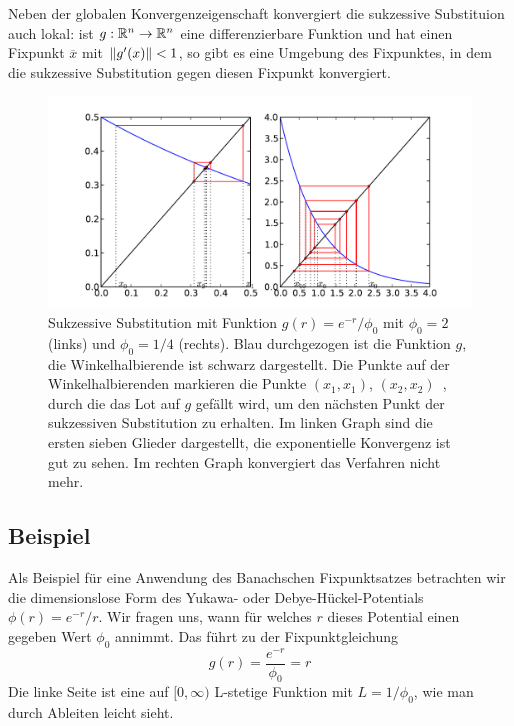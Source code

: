 Neben der globalen Konvergenzeigenschaft konvergiert die sukzessive
Substituion auch lokal: ist $g:\mathbb{R}^n\to\mathbb{R}^n$ eine differenzierbare
Funktion und hat einen Fixpunkt $\overline{x}$ mit $\left\lVert{g'(x)}\right\rVert < 1$,
so gibt es eine Umgebung des Fixpunktes, in dem die sukzessive
Substitution gegen diesen Fixpunkt konvergiert.

\begin{figure}
  \centering
  \includegraphics[width=\textwidth]{plots/banach}
  \caption{Sukzessive Substitution mit Funktion $g(r) = e^{-r}/\phi_0$
    mit $\phi_0=2$ (links) und $\phi_0=1/4$ (rechts). Blau
    durchgezogen ist die Funktion $g$, die Winkelhalbierende ist
    schwarz dargestellt. Die Punkte auf der Winkelhalbierenden
    markieren die Punkte $(x_1,x_1)$, $(x_2,x_2)$ \usw\,, durch die das
    Lot auf $g$ gefällt wird, um den nächsten Punkt der sukzessiven
    Substitution zu erhalten. Im linken Graph sind die ersten sieben
    Glieder dargestellt, die exponentielle Konvergenz ist gut zu
    sehen. Im rechten Graph konvergiert das Verfahren nicht mehr.}
  \label{fig:banach}
\end{figure}

\subsection{Beispiel}

Als Beispiel für eine Anwendung des Banachschen Fixpunktsatzes
betrachten wir die dimensionslose Form des Yukawa- oder
Debye-Hückel-Potentials $\phi(r) = e^{-r}/r$. Wir fragen uns, wann für
welches $r$ dieses Potential einen gegeben Wert $\phi_0$ annimmt. Das
führt zu der Fixpunktgleichung
\begin{equation}
  g(r) = \frac{e^{-r}}{\phi_0} = r
\end{equation}
Die linke Seite ist eine auf $[0,\infty)$ L-stetige Funktion mit
$L=1/\phi_0$, wie man durch Ableiten leicht sieht.

